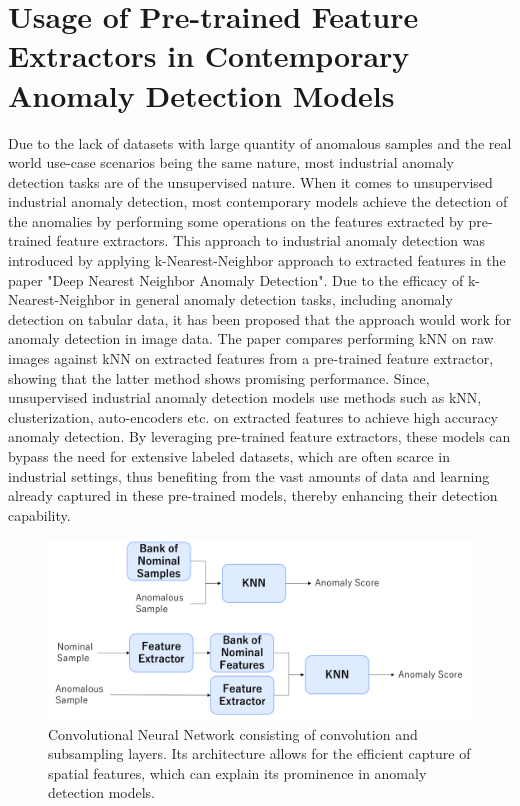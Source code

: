 \section{Usage of Pre-trained Feature Extractors in Contemporary Anomaly Detection Models}
\label{feature extractors}
Due to the lack of datasets with large quantity of anomalous samples and the real world use-case scenarios being the same nature, most industrial anomaly detection tasks are of the unsupervised nature. When it comes to unsupervised industrial anomaly detection, most contemporary models achieve the detection of the anomalies by performing some operations on the features extracted by pre-trained feature extractors. This approach to industrial anomaly detection was introduced by applying k-Nearest-Neighbor approach to extracted features in the paper "Deep Nearest Neighbor Anomaly Detection". Due to the efficacy of k-Nearest-Neighbor in general anomaly detection tasks, including anomaly detection on tabular data, it has been proposed that the approach would work for anomaly detection in image data. The paper compares performing kNN on raw images against kNN on extracted features from a pre-trained feature extractor, showing that the latter method shows promising performance. Since, unsupervised industrial anomaly detection models use methods such as kNN, clusterization, auto-encoders etc. on extracted features to achieve high accuracy anomaly detection. By leveraging pre-trained feature extractors, these models can bypass the need for extensive labeled datasets, which are often scarce in industrial settings, thus benefiting from the vast amounts of data and learning already captured in these pre-trained models, thereby enhancing their detection capability.

\begin{figure}[t]
	\begin{center}
		\includegraphics[width=1.0\linewidth]{Chapter_3/feature_extractor_usage.png}
	\end{center}
	\caption{Convolutional Neural Network consisting of convolution and subsampling layers. Its architecture allows for the efficient capture of spatial features, which can explain its prominence in anomaly detection models.}
	\label{fig:cnn}
\end{figure} 	

